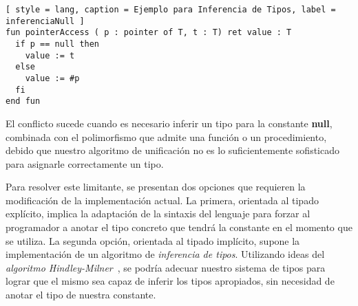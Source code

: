 \begin{lstlisting}[ style = lang, caption = Ejemplo para Inferencia de Tipos, label = inferenciaNull ]
fun pointerAccess ( p : pointer of T, t : T) ret value : T
  if p == null then
    value := t
  else
    value := #p
  fi
end fun
\end{lstlisting}

El conflicto sucede cuando es necesario inferir un tipo para la constante \textbf{null}, combinada con el polimorfismo que admite una función o un procedimiento, debido que nuestro algoritmo de unificación no es lo suficientemente sofisticado para asignarle correctamente un tipo.

Para resolver este limitante, se presentan dos opciones que requieren la modificación de la implementación actual.
La primera, orientada al tipado explícito, implica la adaptación de la sintaxis del lenguaje para forzar al programador a anotar el tipo concreto que tendrá la constante en el momento que se utiliza.
La segunda opción, orientada al tipado implícito, supone la implementación de un algoritmo de \textit{inferencia de tipos}.
Utilizando ideas del \textit{algoritmo Hindley-Milner}~\cite{Inferencia}, se podría adecuar nuestro sistema de tipos para lograr que el mismo sea capaz de inferir los tipos apropiados, sin necesidad de anotar el tipo de nuestra constante.